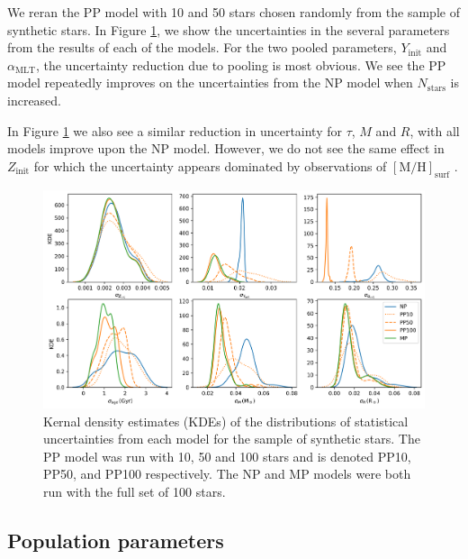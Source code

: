 \documentclass[a4paper,fleqn,usenatbib]{mnras}
\newcommand{\metallicity}{\ensuremath{[\mathrm{M}/\mathrm{H}]}}
\newcommand{\mlt}{\ensuremath{{\alpha_\mathrm{MLT}}}}
\begin{document}
We reran the PP model with 10 and 50 stars chosen randomly from the sample of synthetic stars. In Figure \ref{fig:shrinkage}, we show the uncertainties in the several parameters from the results of each of the models. For the two pooled parameters, $Y_\mathrm{init}$ and $\mlt$, the uncertainty reduction due to pooling is most obvious. We see the PP model repeatedly improves on the uncertainties from the NP model when $N_\mathrm{stars}$ is increased. 

In Figure \ref{fig:shrinkage} we also see a similar reduction in uncertainty for $\tau$, $M$ and $R$, with all models improve upon the NP model. However, we do not see the same effect in $Z_\mathrm{init}$ for which the uncertainty appears dominated by observations of $\metallicity_\mathrm{surf}$ .

\begin{figure}
    \centering
    \includegraphics[width=\textwidth]{figures/shrinkage.png}
    \caption{Kernal density estimates (KDEs) of the distributions of statistical uncertainties from each model for the sample of synthetic stars. The PP model was run with 10, 50 and 100 stars and is denoted PP10, PP50, and PP100 respectively. The NP and MP models were both run with the full set of 100 stars.}
    \label{fig:shrinkage}
\end{figure}

\subsection{Population parameters}

\end{document}
